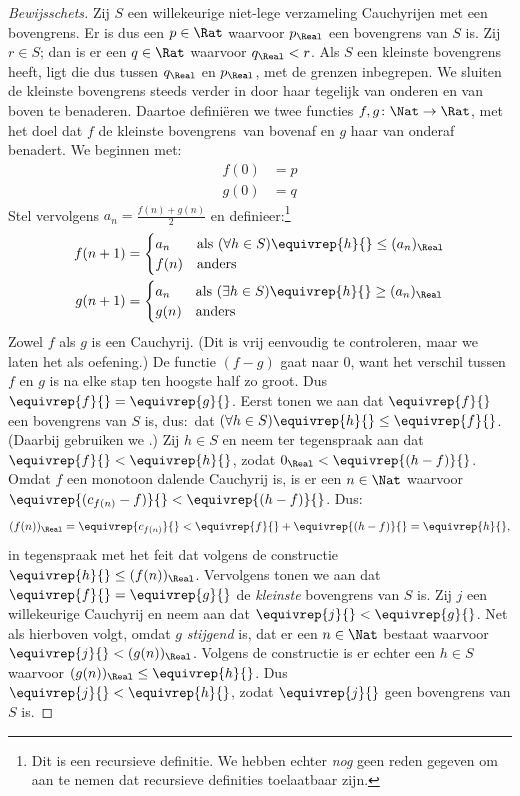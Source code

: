 \documentclass[openany]{memoir}
\begin{document}
\begin{proof}[Bewijsschets] Zij $S$ een willekeurige niet-lege
verzameling Cauchyrijen met een bovengrens. Er is dus een $p \in \Rat$
waarvoor $p_{\Real}$ een bovengrens van $S$ is. Zij $r \in S$; dan is er
een $q \in \Rat$ waarvoor $q_{\Real} < r$. Als $S$ een kleinste
bovengrens heeft, ligt die dus tussen $q_\Real$ en $p_\Real$, met de
grenzen inbegrepen.
We sluiten de kleinste bovengrens steeds verder in door haar tegelijk
van onderen en van boven te benaderen. Daartoe definiëren we twee
functies $f, g \colon \Nat \to \Rat$, met het doel dat $f$ de kleinste
bovengrens\ van bovenaf en $g$ haar van onderaf benadert. We beginnen
met:
\begin{align*}
	f(0) &= p \\
	g(0) &= q
\end{align*}
Stel vervolgens $a_n = \frac{f(n) + g(n)}{2}$ en
definieer:\footnote{Dit is een recursieve definitie. We hebben echter
\emph{nog} geen reden gegeven om aan te nemen dat recursieve definities
toelaatbaar zijn.}
\begin{align*}
	f(n+1) &=
	\begin{cases}
		a_n &\text{als }(\forall h \in S)\equivrep{h}{} \leq (a_n)_\Real\\
		f(n)&\text{anders}
	\end{cases}\\
	g(n+1) &=
	\begin{cases}
		a_n &\text{als }(\exists h \in S)\equivrep{h}{} \geq (a_n)_\Real\\
	 	g(n) &\text{anders}
	\end{cases}
\end{align*}
Zowel $f$ als $g$ is een Cauchyrij. (Dit is vrij eenvoudig te
controleren, maar we laten het als oefening.) De functie $(f-g)$ gaat
naar $0$, want het verschil tussen $f$ en $g$ is na elke stap ten
hoogste half zo groot. Dus $\equivrep{f}{} = \equivrep{g}{}$.
Eerst tonen we aan dat $\equivrep{f}{}$ een bovengrens van $S$ is,
dus:\ dat $(\forall h \in S)\equivrep{h}{} \leq \equivrep{f}{}$. (Daarbij
gebruiken we .) Zij $h \in S$ en neem ter
tegenspraak aan dat $\equivrep{f}{} < \equivrep{h}{}$, zodat $0_\Real <
\equivrep{(h-f)}{}$. Omdat $f$ een monotoon dalende Cauchyrij is, is er
een $n \in \Nat$ waarvoor $\equivrep{(c_{f(n)} - f)}{} <
\equivrep{(h-f)}{}$. Dus:
\[
	(f(n))_\Real = \equivrep{c_{f(n)}}{} < \equivrep{f}{} + \equivrep{(h-f)}{} = \equivrep{h}{},
\]
in tegenspraak met het feit dat volgens de constructie
$\equivrep{h}{} \leq (f(n))_\Real$.
Vervolgens tonen we aan dat $\equivrep{f}{} = \equivrep{g}{}$ de
\emph{kleinste} bovengrens van $S$ is. Zij $j$ een willekeurige
Cauchyrij en neem aan dat $\equivrep{j}{} < \equivrep{g}{}$. Net als
hierboven volgt, omdat $g$ \emph{stijgend} is, dat er een $n \in \Nat$
bestaat waarvoor $\equivrep{j}{} < (g(n))_\Real$. Volgens de constructie
is er echter een $h \in S$ waarvoor $(g(n))_\Real \leq
\equivrep{h}{}$. Dus $\equivrep{j}{} < \equivrep{h}{}$, zodat
$\equivrep{j}{}$ geen bovengrens van $S$ is.
\end{proof}
\endgroup
\OLEndChapterHook
\end{document}
